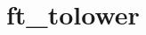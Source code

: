 \chapter{ft\+\_\+tolower}
\hypertarget{md_Documentation_2ft__tolower}{}\label{md_Documentation_2ft__tolower}
